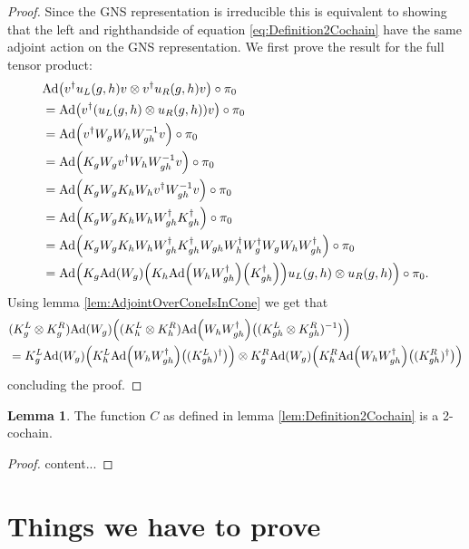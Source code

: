 \documentclass[12pt,a4paper,twoside]{article}
\let\originalleft\left
\let\originalright\right
\renewcommand{\left}{\mathopen{}\mathclose\bgroup\originalleft}
\renewcommand{\right}{\aftergroup\egroup\originalright}
\newcommand{\Ad}[1]{\textrm{Ad}\left(#1\right)}
\theoremstyle{definition}
\newtheorem{lemma}[theorem]{Lemma}
\numberwithin{equation}{section}
\begin{document}
\begin{proof}
	Since the GNS representation is irreducible this is equivalent to showing that the left and righthandside of equation \eqref{eq:Definition2Cochain} have the same adjoint action on the GNS representation. We first prove the result for the full tensor product:
	\begin{align}
		&\Ad{v^\dagger u_L(g,h)v\otimes v^\dagger u_R(g,h) v}\circ\pi_0\\
		&=\Ad{v^\dagger (u_L(g,h)\otimes u_R(g,h)) v}\circ\pi_0\\
		&=\Ad{v^\dagger W_g W_h W_{gh}^{-1}v}\circ\pi_0\\
		&=\Ad{K_gW_g v^\dagger W_h W_{gh}^{-1}v}\circ\pi_0\\
		&=\Ad{K_gW_g K_h W_h v^\dagger W_{gh}^{-1}v}\circ\pi_0\\
		&=\Ad{K_gW_g K_h W_h W_{gh}^\dagger K_{gh}^\dagger }\circ\pi_0\\
		&=\Ad{K_gW_g K_h W_h W_{gh}^\dagger K_{gh}^\dagger W_{gh}W_h^\dagger W_g^\dagger W_gW_hW_{gh}^\dagger}\circ\pi_0\\
		&=\Ad{K_g\Ad{W_g}\left(K_h\Ad{W_hW_{gh}^\dagger}\left(K_{gh}^\dagger\right)\right)u_L(g,h)\otimes u_
			R(g,h)}\circ\pi_0.
	\end{align}
	Using lemma \ref{lem:AdjointOverConeIsInCone} we get that
	\begin{align}
		&(K_g^L\otimes K_g^R)\Ad{W_g}\left((K_h^L\otimes K_h^R)\Ad{W_hW_{gh}^\dagger}\left((K_{gh}^L\otimes K_{gh}^R)^{-1}\right)\right)\\
		&=K_g^L\Ad{W_g}\left(K_h^L\Ad{W_hW_{gh}^\dagger}\left((K_{gh}^L)^\dagger\right)\right)\otimes K_g^R\Ad{W_g}\left(K_h^R\Ad{W_hW_{gh}^\dagger}\left((K_{gh}^R)^\dagger\right)\right)
	\end{align}
	concluding the proof.
\end{proof}
\begin{lemma}
	The function $C$ as defined in lemma \ref{lem:Definition2Cochain} is a 2-cochain.
\end{lemma}
\begin{proof}
	content...
\end{proof}
\section{Things we have to prove}



\end{document}
